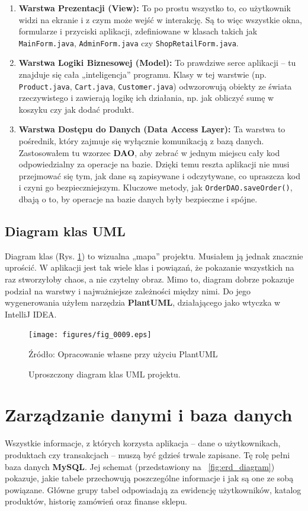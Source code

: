 \begin{enumerate}
    \item \textbf{Warstwa Prezentacji (View):} To po prostu wszystko to, co użytkownik widzi na ekranie i z czym może wejść w interakcję. Są to więc wszystkie okna, formularze i przyciski aplikacji, zdefiniowane w klasach takich jak \texttt{MainForm.java}, \texttt{AdminForm.java} czy \texttt{ShopRetailForm.java}.

    \item \textbf{Warstwa Logiki Biznesowej (Model):} To prawdziwe serce aplikacji – tu znajduje się cała „inteligencja” programu. Klasy w tej warstwie (np. \texttt{Product.java}, \texttt{Cart.java}, \texttt{Customer.java}) odwzorowują obiekty ze świata rzeczywistego i zawierają logikę ich działania, np. jak obliczyć sumę w koszyku czy jak dodać produkt.

\item \textbf{Warstwa Dostępu do Danych (Data Access Layer):} Ta warstwa to pośrednik, który zajmuje się wyłącznie komunikacją z bazą danych. Zastosowałem tu wzorzec \textbf{DAO}, aby zebrać w jednym miejscu cały kod odpowiedzialny za operacje na bazie. Dzięki temu reszta aplikacji nie musi przejmować się tym, jak dane są zapisywane i odczytywane, co upraszcza kod i czyni go bezpieczniejszym. Kluczowe metody, jak \texttt{OrderDAO.saveOrder()}, dbają o to, by operacje na bazie danych były bezpieczne i spójne.
\end{enumerate}
\clearpage

\subsection{Diagram klas UML}
Diagram klas (Rys. \ref{fig:uml_diagram}) to wizualna „mapa” projektu. Musiałem ją jednak znacznie uprościć. W aplikacji jest tak wiele klas i powiązań, że pokazanie wszystkich na raz stworzyłoby chaos, a nie czytelny obraz. Mimo to, diagram dobrze pokazuje podział na warstwy i najważniejsze zależności między nimi. Do jego wygenerowania użyłem narzędzia \textbf{PlantUML}, działającego jako wtyczka w IntelliJ IDEA.

\begin{figure}[H]
    \centering
    \texttt{[image: figures/fig\_0009.eps]}
    \caption{Uproszczony diagram klas UML projektu.}
    \label{fig:uml_diagram}
    \small{Źródło: Opracowanie własne przy użyciu PlantUML}
\end{figure}
\clearpage

\section{Zarządzanie danymi i baza danych}
\label{sec:baza_danych_nowe}
Wszystkie informacje, z których korzysta aplikacja – dane o użytkownikach, produktach czy transakcjach – muszą być gdzieś trwale zapisane. Tę rolę pełni baza danych \textbf{MySQL}. Jej schemat (przedstawiony na \figurename~\ref{fig:erd_diagram}) pokazuje, jakie tabele przechowują poszczególne informacje i jak są one ze sobą powiązane. Główne grupy tabel odpowiadają za ewidencję użytkowników, katalog produktów, historię zamówień oraz finanse sklepu.

